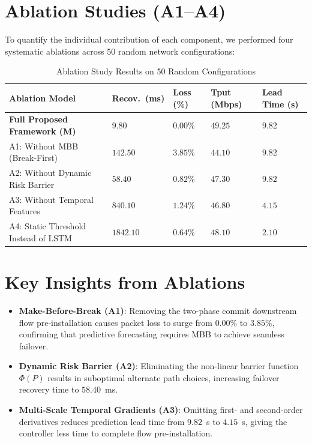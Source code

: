\documentclass[11pt,a4paper]{report}
\begin{document}
\section{Ablation Studies (A1--A4)}
To quantify the individual contribution of each component, we performed four systematic ablations across 50 random network configurations:

\begin{table}[htbp]
\centering
\caption{Ablation Study Results on 50 Random Configurations}
\label{tab:ablations}
\small
\setlength{\tabcolsep}{4.5pt}
\begin{tabularx}{\linewidth}{@{} p{6.0cm} >{\centering\arraybackslash}X >{\centering\arraybackslash}X >{\centering\arraybackslash}X >{\centering\arraybackslash}X @{}}
\toprule
\textbf{Ablation Model} & \textbf{Recov.\ (ms)} & \textbf{Loss (\%)} & \textbf{Tput (Mbps)} & \textbf{Lead Time (s)} \\
\midrule
\textbf{Full Proposed Framework (M)} & $\mathbf{9.80}$ & $\mathbf{0.00\%}$ & $\mathbf{49.25}$ & $\mathbf{9.82}$ \\
A1: Without MBB (Break-First)        & $142.50$ & $3.85\%$ & $44.10$ & $9.82$ \\
A2: Without Dynamic Risk Barrier     & $58.40$  & $0.82\%$ & $47.30$ & $9.82$ \\
A3: Without Temporal Features        & $840.10$ & $1.24\%$ & $46.80$ & $4.15$ \\
A4: Static Threshold Instead of LSTM & $1842.10$& $0.64\%$ & $48.10$ & $2.10$ \\
\bottomrule
\end{tabularx}
\end{table}

\section{Key Insights from Ablations}
\begin{itemize}
    \item \textbf{Make-Before-Break (A1)}: Removing the two-phase commit downstream flow pre-installation causes packet loss to surge from $0.00\%$ to $3.85\%$, confirming that predictive forecasting requires MBB to achieve seamless failover.
    \item \textbf{Dynamic Risk Barrier (A2)}: Eliminating the non-linear barrier function $\Phi(P)$ results in suboptimal alternate path choices, increasing failover recovery time to $58.40$~ms.
    \item \textbf{Multi-Scale Temporal Gradients (A3)}: Omitting first- and second-order derivatives reduces prediction lead time from $9.82$~s to $4.15$~s, giving the controller less time to complete flow pre-installation.
\end{itemize}
\end{document}
